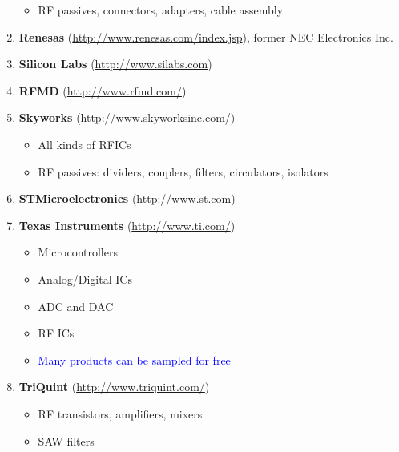 \documentclass[letterpaper, 11pt]{article}
\begin{document}
\begin{enumerate}
\begin{itemize}
			\item RF passives, connectors, adapters, cable assembly
		\end{itemize}
	\item \textbf{Renesas} (\url{http://www.renesas.com/index.jsp}), former NEC Electronics Inc.
	\item \textbf{Silicon Labs} (\url{http://www.silabs.com})
	\item \textbf{RFMD} (\url{http://www.rfmd.com/})
	\item \textbf{Skyworks} (\url{http://www.skyworksinc.com/})
		\begin{itemize}
			\item All kinds of RFICs
			\item RF passives: dividers, couplers, filters, circulators, isolators
		\end{itemize}
	\item \textbf{STMicroelectronics} (\url{http://www.st.com})
	\item \textbf{Texas Instruments} (\url{http://www.ti.com/})
		\begin{itemize}
			\item Microcontrollers
			\item Analog/Digital ICs
			\item ADC and DAC
			\item RF ICs
			\item \textcolor{blue}{Many products can be sampled for free}		
		\end{itemize}
	\item \textbf{TriQuint} (\url{http://www.triquint.com/})
		\begin{itemize}
			\item RF transistors, amplifiers, mixers
			\item SAW filters
		\end{itemize}
\end{enumerate}
\end{document}
